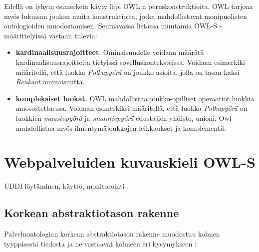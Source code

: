 \documentclass[finnish]{tktltiki2}
\theoremstyle{definition}
\theoremstyle{remark}
\begin{document}
Edellä on lyhyin esimerkein käyty läpi OWL:n peruskonstruktioita. OWL tarjoaa myös lukuisan joukon muita konstruktioita, jotka mahdollistavat monipuolisten ontologioiden muodostamisen. Seuraavassa listassa muutamia OWL-S -määrittelyissä vastaan tulevia:

\begin{itemize}
 \item \textbf{kardinaalisuusrajoitteet}. Ominaisuudelle voidaan määrätä kardinaalisuusrajoitteita tietyissä sovelluskonteksteissa. Voidaan esimerkiki määritellä, että luokka \textit{Polkupyörä} on joukko asioita, jolla on tasan kaksi \textit{Renkaat} ominaisuutta.
  \item \textbf{kompleksiset luokat}. OWL mahdollistaa joukko-opilliset operaatiot luokkia muosostettaessa. Voidaan esimerkiksi määritellä, että luokka \textit{Polkupyörä} on luokkien \textit{maastopyörä} ja \textit{maantiepyörä} edustajien yhdiste, unioni. Owl mahdollistaa myös ilmentymäjoukkojen leikkaukset ja komplementit. 
\end{itemize}

\section{Webpalveluiden kuvauskieli OWL-S}

UDDI löytäminen, käyttö, monitorointi

\subsection{Korkean abstraktiotason rakenne}

Palveluontologian korkean abstraktiotason rakenne muodostuu kolmen tyyppisestä tiedosta ja ne vastaavat kolmeen eri kysymykseen \cite{OWLS}:
\end{document}

